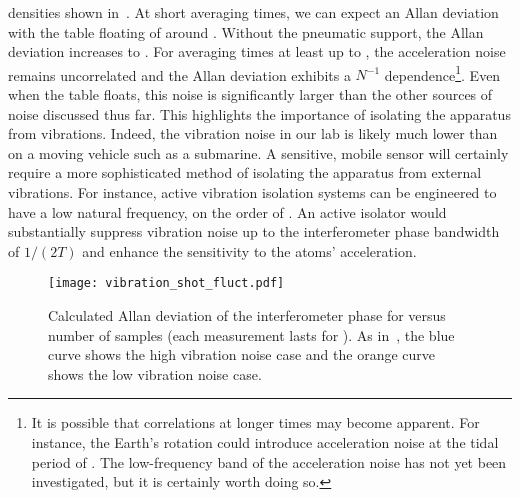 densities shown in~. 
At short averaging times, we can expect an Allan deviation with the
table floating of around . Without the
pneumatic support, the Allan deviation increases to
. For averaging times at least up to
, the acceleration noise remains uncorrelated and
the Allan deviation exhibits a $N^{-1}$
dependence\footnote{It is possible that correlations at longer times may
become apparent. For instance, the Earth's rotation could introduce
acceleration noise at the tidal period of . The
low-frequency band of the acceleration noise has not yet been investigated, but it is certainly worth
doing so.}. Even when the table floats,
this noise is significantly larger than the other sources of noise
discussed thus
far. This
highlights the importance of isolating the apparatus from vibrations.
Indeed, the vibration noise in our lab is likely much lower than on a
moving vehicle such as a submarine. 
A sensitive, mobile sensor will certainly require a more sophisticated
method of isolating the apparatus from external vibrations. For
instance, active
vibration isolation systems can be engineered to have a low natural
frequency, on the order of
\cite{Zhou2012}. An active isolator would
substantially suppress vibration noise up to the interferometer phase
bandwidth of $1/(2T)$ and enhance the sensitivity to the atoms'
acceleration.
\begin{figure}[htpb]
  \centering
  \texttt{[image: vibration\_shot\_fluct.pdf]}
  \caption{Calculated Allan deviation of the interferometer phase for
    versus number of samples (each measurement lasts for
    ). As in~, the blue curve
shows the high vibration noise case and the orange curve shows the low
vibration noise case.}
  \label{fig:vibration_shot_fluct}
\end{figure}
